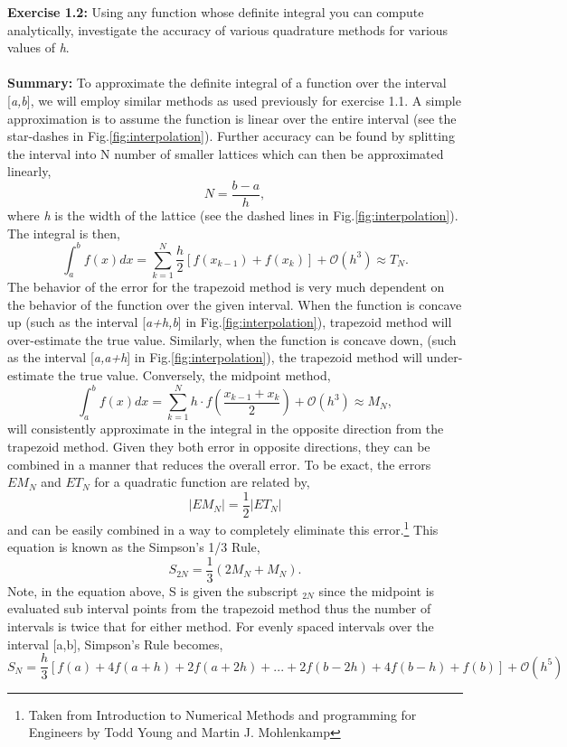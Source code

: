 \documentclass[10pt]{article}
\begin{document}
\textbf{Exercise 1.2:} Using any function whose definite integral you can compute analytically, investigate the accuracy of various quadrature methods for various values of \textit{h}. \\
\\
\textbf{Summary:}
To approximate the definite integral of a function over the interval [\textit{a,b}], we will employ similar methods as used previously for exercise 1.1. A simple approximation is to assume the function is linear over the entire interval (see the star-dashes in Fig.\ref{fig:interpolation}). Further accuracy can be found by splitting the interval into N number of smaller lattices which can then be approximated linearly,
\[
N = \frac{b-a}{h},
\]
where \textit{h} is the width of the lattice (see the dashed lines in Fig.\ref{fig:interpolation}). The integral is then,
\begin{equation}
\int^b_a f(x)dx = \sum^N_{k=1} \frac{h}{2}[f(x_{k-1})+f(x_k)] + \mathcal{O}(h^3) \approx T_N.
\end{equation}
The behavior of the error for the trapezoid method is very much dependent on the behavior of the function over the given interval. When the function is concave up (such as the interval [\textit{a+h,b}] in Fig.\ref{fig:interpolation}), trapezoid method will over-estimate the true value. Similarly, when the function is concave down, (such as the interval [\textit{a,a+h}] in Fig.\ref{fig:interpolation}), the trapezoid method will under-estimate the true value. Conversely, the midpoint method,
\begin{equation}
\int^b_a f(x)dx = \sum^N_{k=1} h\cdot f\left(\frac{x_{k-1}+x_k}{2}\right) + \mathcal{O}(h^3) \approx M_N,
\end{equation}
will consistently approximate in the integral in the opposite direction from the trapezoid method. Given they both error in opposite directions, they can be combined in a manner that reduces the overall error. To be exact, the errors $EM_N$ and $ET_N$ for a quadratic function are related by,
\[
|EM_N| = \frac{1}{2}|ET_N|
\]
and can be easily combined in a way to completely eliminate this error.\footnote{Taken from Introduction to Numerical Methods and  programming for Engineers by Todd Young and Martin J. Mohlenkamp} This equation is known as the Simpson's 1/3 Rule, 
\[
S_{2N} = \frac{1}{3}(2M_N + M_N).
\]
Note, in the equation above, S is given the subscript $_{2N}$ since the midpoint is evaluated sub interval points from the trapezoid method thus the number of intervals is twice that for either method. For evenly spaced intervals over the interval [a,b], Simpson's Rule becomes,
\begin{equation}
S_N = \frac{h}{3}[f(a)+4f(a+h)+2f(a+2h)+...+2f(b-2h)+4f(b-h)+f(b)] + \mathcal{O}(h^5)
\end{equation}
\end{document}
